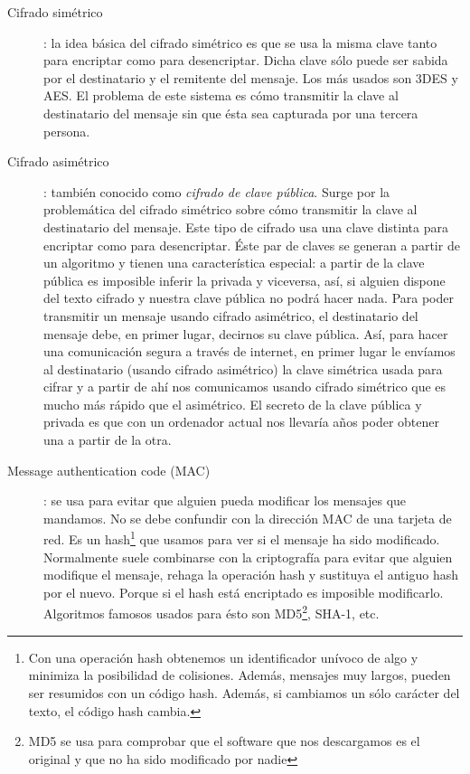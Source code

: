 \documentclass[10pt,a4paper,spanish]{report}
\begin{document}
\begin{description}
  \item[Cifrado simétrico]: la idea básica del cifrado simétrico es que se usa la misma clave tanto para encriptar como para desencriptar. Dicha clave sólo puede ser sabida por el destinatario y el remitente del mensaje. Los más usados son 3DES y AES. El problema de este sistema es cómo transmitir la clave al destinatario del mensaje sin que ésta sea capturada por una tercera persona.
  \item[Cifrado asimétrico]: también conocido como \textit{\textcolor{tema2}{cifrado de clave pública}}. Surge por la problemática del cifrado simétrico sobre cómo transmitir la clave al destinatario del mensaje. Este tipo de cifrado usa una clave distinta para encriptar como para desencriptar. Éste par de claves se generan a partir de un algoritmo y tienen una característica especial: a partir de la clave pública es imposible inferir la privada y viceversa, así, si alguien dispone del texto cifrado y nuestra clave pública no podrá hacer nada. Para poder transmitir un mensaje usando cifrado asimétrico, el destinatario del mensaje debe, en primer lugar, decirnos su clave pública. Así, para hacer una comunicación segura a través de internet, en primer lugar le envíamos al destinatario (usando cifrado asimétrico) la clave simétrica usada para cifrar y a partir de ahí nos comunicamos usando cifrado simétrico que es mucho más rápido que el asimétrico. El secreto de la clave pública y privada es que con un ordenador actual nos llevaría años poder obtener una a partir de la otra.
  \item[Message authentication code (MAC)]: se usa para evitar que alguien pueda modificar los mensajes que mandamos. No se debe confundir con la dirección MAC de una tarjeta de red. Es un hash\footnote{Con una operación hash obtenemos un identificador unívoco de algo y minimiza la posibilidad de colisiones. Además, mensajes muy largos, pueden ser resumidos con un código hash. Además, si cambiamos un sólo carácter del texto, el código hash cambia.} que usamos para ver si el mensaje ha sido modificado. Normalmente suele combinarse con la criptografía para evitar que alguien modifique el mensaje, rehaga la operación hash y sustituya el antiguo hash por el nuevo. Porque si el hash está encriptado es imposible modificarlo. Algoritmos famosos usados para ésto son MD5\footnote{MD5 se usa para comprobar que el software que nos descargamos es el original y que no ha sido modificado por nadie}, SHA-1, etc.

\end{description}
\end{document}
